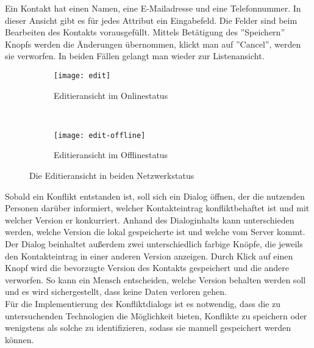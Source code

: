 Ein Kontakt hat einen Namen, eine E-Mailadresse und eine Telefonnummer. In dieser Ansicht gibt es für jedes Attribut ein Eingabefeld. Die Felder sind beim Bearbeiten des Kontakts vorausgefüllt. Mittels Betätigung des ''Speichern'' Knopfs werden die Änderungen übernommen, klickt man auf ''Cancel'', werden sie verworfen. In beiden Fällen gelangt man wieder zur Listenansicht.
\begin{figure}[H]
  \centering
  \begin{subfigure}[t]{0.49\textwidth}
          \texttt{[image: edit]}
          \caption{Editieransicht im Onlinestatus}
          \label{fig:edit-online}
  \end{subfigure}
  ~ 
  \begin{subfigure}[t]{0.49\textwidth}
          \texttt{[image: edit-offline]}
          \caption{Editieransicht im Offlinestatus}
          \label{fig:edit-offline}
  \end{subfigure}
  \grayRule
  \caption{Die Editieransicht in beiden Netzwerkstatus}
  \label{fig:edit}
\end{figure}
Sobald ein Konflikt entstanden ist, soll sich ein Dialog öffnen, der die nutzenden Personen darüber informiert, welcher Kontakteintrag konfliktbehaftet ist und mit welcher Version er konkurriert.
Anhand des Dialoginhalts kann unterschieden werden, welche Version die lokal gespeicherte ist und welche vom Server kommt.
Der Dialog beinhaltet außerdem zwei unterschiedlich farbige Knöpfe, die jeweils den Kontakteintrag in einer anderen Version anzeigen.
Durch Klick auf einen Knopf wird die bevorzugte Version des Kontakts gespeichert und die andere verworfen.
So kann ein Mensch entscheiden, welche Version behalten werden soll und es wird sichergestellt, dass keine Daten verloren gehen.\\
Für die Implementierung des Konfliktdialogs ist es notwendig, dass die zu untersuchenden Technologien die Möglichkeit bieten, Konflikte zu speichern oder wenigstens als solche zu identifizieren, sodass sie manuell gespeichert werden können.